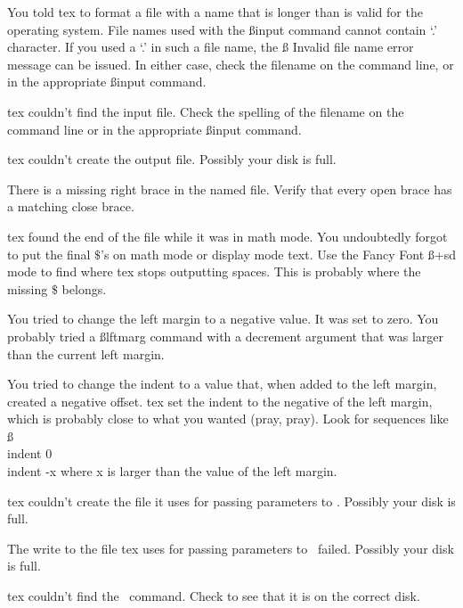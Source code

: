 {\describe

 You told tex to format a file with a
name that is longer than is valid for the operating system. File
names used with the {\ss input} command cannot contain `.'
character. If you used a `.' in such a file name, the {\ss
Invalid file name} error message can be issued. In either case,
check the filename on the command line, or in the appropriate
{\ss input} command.

 tex couldn't find the input file. Check
the spelling of the filename on the command line or in the
appropriate {\ss input} command.

 tex couldn't create the output file.
Possibly your disk is full.

 There is a missing right
brace in the named file. Verify that every open brace has a
matching close brace.

 tex found the end of the
file while it was in math mode. You undoubtedly forgot to put the
final $\$$'s on math mode or display mode text. Use the {\FF Fancy
Font} {\ss +sd} mode to find where tex stops outputting spaces.
This is probably where the missing $\$$ belongs.

 You tried to
change the left margin to a negative value. It was set to zero.
You probably tried a {\ss lftmarg} command with a decrement
argument that was larger than the current left margin.

 You tried to change the indent to
a value that, when added to the left margin, created a negative
offset. tex set the indent to the negative of the left margin,
which is probably close to what you wanted (pray, pray). Look for
sequences like {\ss \\indent 0\\indent -x} where x is larger than
the value of the left margin.

 tex couldn't create the file it
uses for passing parameters to \pfont. Possibly your disk is
full.

 The write to the file tex uses for
passing parameters to \pfont\ failed. Possibly your disk is
full.

 tex couldn't find the \pfont\ command.
Check to see that it is on the correct disk.

}
